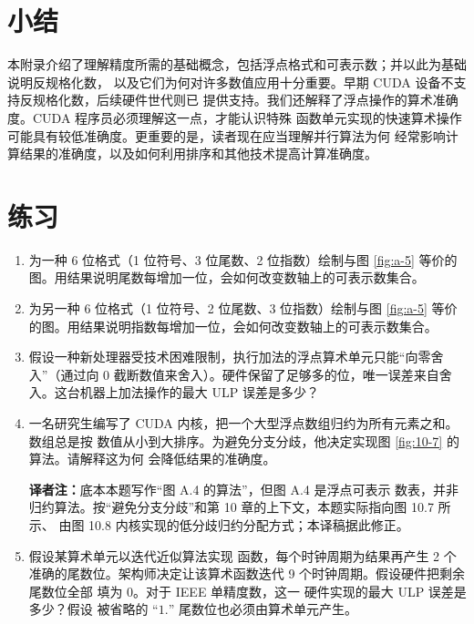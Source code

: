 \section{小结}
\label{sec:appa-summary}

本附录介绍了理解精度所需的基础概念，包括浮点格式和可表示数；并以此为基础说明反规格化数，
以及它们为何对许多数值应用十分重要。早期 CUDA 设备不支持反规格化数，后续硬件世代则已
提供支持。我们还解释了浮点操作的算术准确度。CUDA 程序员必须理解这一点，才能认识特殊
函数单元实现的快速算术操作可能具有较低准确度。更重要的是，读者现在应当理解并行算法为何
经常影响计算结果的准确度，以及如何利用排序和其他技术提高计算准确度。

\section{练习}
\label{sec:appa-exercises}

\begin{enumerate}[label=\arabic*.,leftmargin=2.7em]
  \item 为一种 6 位格式（1 位符号、3 位尾数、2 位指数）绘制与图 \ref{fig:a-5} 等价的
  图。用结果说明尾数每增加一位，会如何改变数轴上的可表示数集合。

  \item 为另一种 6 位格式（1 位符号、2 位尾数、3 位指数）绘制与图 \ref{fig:a-5} 等价
  的图。用结果说明指数每增加一位，会如何改变数轴上的可表示数集合。

  \item 假设一种新处理器受技术困难限制，执行加法的浮点算术单元只能“向零舍入”（通过向
  0 截断数值来舍入）。硬件保留了足够多的位，唯一误差来自舍入。这台机器上加法操作的最大
  ULP 误差是多少？

  \item 一名研究生编写了 CUDA 内核，把一个大型浮点数组归约为所有元素之和。数组总是按
  数值从小到大排序。为避免分支分歧，他决定实现图 \ref{fig:10-7} 的算法。请解释这为何
  会降低结果的准确度。

  \par\noindent\textbf{译者注：}底本本题写作“图 A.4 的算法”，但图 A.4 是浮点可表示
  数表，并非归约算法。按“避免分支分歧”和第 10 章的上下文，本题实际指向图 10.7 所示、
  由图 10.8 内核实现的低分歧归约分配方式；本译稿据此修正。

  \item 假设某算术单元以迭代近似算法实现  函数，每个时钟周期为结果再产生
  2 个准确的尾数位。架构师决定让该算术函数迭代 9 个时钟周期。假设硬件把剩余尾数位全部
  填为 0。对于 IEEE 单精度数，这一  硬件实现的最大 ULP 误差是多少？假设
  被省略的 ``$1.$'' 尾数位也必须由算术单元产生。
\end{enumerate}

